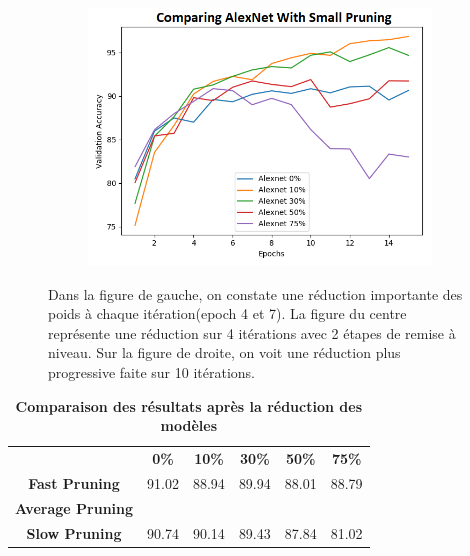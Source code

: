 \documentclass[12pt]{article}
\begin{document}
\begin{figure}[H]
\begin{subfigure}[b]{0.33\textwidth}
		\label{fig:pruneratioslow}
	\end{subfigure}
	\begin{subfigure}[b]{0.33\textwidth}
		\centering
		\includegraphics[width=\textwidth]{prune_ratio_slow}
		\label{fig:pruneratioslow}
	\end{subfigure}
	\caption{Dans la figure de gauche, on constate une réduction importante des poids à chaque itération(epoch 4 et 7). La figure du centre représente une réduction sur 4 itérations avec 2 étapes de remise à niveau. Sur la figure de droite, on voit une réduction plus progressive faite sur 10 itérations.}
\end{figure}

\begin{table}[H]
	\centering
	\caption {\textbf{Comparaison des résultats après la réduction des modèles}}
	\begin{tabular}{clllll}
		\textbf{}                & \multicolumn{1}{c}{\textbf{0\%}} & \multicolumn{1}{c}{\textbf{10\%}} & \multicolumn{1}{c}{\textbf{30\%}} & \multicolumn{1}{c}{\textbf{50\%}} & \multicolumn{1}{c}{\textbf{75\%}} \\
		\textbf{Fast Pruning}    & 91.02                            & 88.94                             & 89.94                             & 88.01                             & 88.79                             \\
		\textbf{Average Pruning} &                                  &                                   &                                   &                                   &                                   \\
		\textbf{Slow Pruning}    & 90.74                            & 90.14                             & 89.43                             & 87.84                             & 81.02                            
	\end{tabular}
\end{table}
\end{document}
